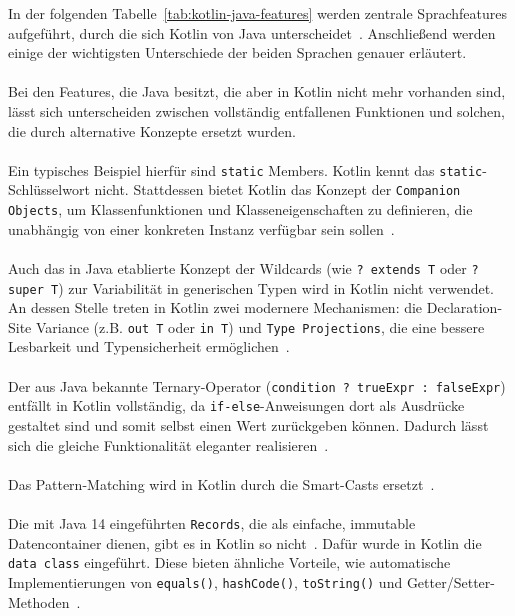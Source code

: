 \documentclass[11pt]{article}
\begin{document}
    In der folgenden Tabelle~\ref{tab:kotlin-java-features} werden zentrale Sprachfeatures aufgeführt, durch die sich Kotlin von Java unterscheidet~\cite{doc-comparison}.
    Anschließend werden einige der wichtigsten Unterschiede der beiden Sprachen genauer erläutert.\\
    \\
    Bei den Features, die Java besitzt, die aber in Kotlin nicht mehr vorhanden sind, lässt sich unterscheiden zwischen vollständig entfallenen Funktionen und solchen, die durch alternative Konzepte ersetzt wurden.\\
    \\
    Ein typisches Beispiel hierfür sind \texttt{static} Members.
    Kotlin kennt das \texttt{static}-Schlüsselwort nicht.
    Stattdessen bietet Kotlin das Konzept der \texttt{Companion Objects}, um Klassenfunktionen und Klasseneigenschaften zu definieren, die unabhängig von einer konkreten Instanz verfügbar sein sollen~\cite{kotlin-static-members}.\\
    \\
    Auch das in Java etablierte Konzept der Wildcards (wie \texttt{? extends T} oder \texttt{? super T}) zur Variabilität in generischen Typen wird in Kotlin nicht verwendet.
    An dessen Stelle treten in Kotlin zwei modernere Mechanismen: die Declaration-Site Variance (z.B. \texttt{out T} oder \texttt{in T}) und \texttt{Type Projections}, die eine bessere Lesbarkeit und Typensicherheit ermöglichen~\cite{doc-comparison}.\\
    \\
    Der aus Java bekannte Ternary-Operator (\texttt{condition ? trueExpr : falseExpr}) entfällt in Kotlin vollständig, da \texttt{if-else}-Anweisungen dort als Ausdrücke gestaltet sind und somit selbst einen Wert zurückgeben können.
    Dadurch lässt sich die gleiche Funktionalität eleganter realisieren~\cite{doc-comparison}.\\
    \\
    Das Pattern-Matching wird in Kotlin durch die Smart-Casts ersetzt~\cite{doc-comparison}.\\
    \\
    Die mit Java 14 eingeführten \texttt{Records}, die als einfache, immutable Datencontainer dienen, gibt es in Kotlin so nicht~\cite{jdk-record}.
    Dafür wurde in Kotlin die \texttt{data class} eingeführt.
    Diese bieten ähnliche Vorteile, wie automatische Implementierungen von \texttt{equals()}, \texttt{hashCode()}, \texttt{toString()} und Getter/Setter-Methoden~\cite{kotlin-data-class}.\\
\end{document}
